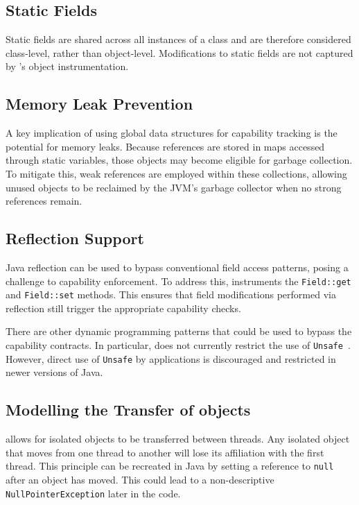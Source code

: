 \subsection{Static Fields}
Static fields are shared across all instances of a class and are therefore considered class-level, rather than object-level. Modifications to static fields are not captured by \jdala's object instrumentation. 

\subsection{Memory Leak Prevention}

A key implication of using global data structures for capability tracking is the potential for memory leaks. Because references are stored in maps accessed through static variables, those objects may become eligible for garbage collection. To mitigate this, weak references are employed within these collections, allowing unused objects to be reclaimed by the JVM's garbage collector when no strong references remain.


\subsection{Reflection Support}

Java reflection can be used to bypass conventional field access patterns, posing a challenge to capability enforcement. To address this, \jdala instruments the \texttt{Field::get} and \texttt{Field::set} methods. This ensures that field modifications performed via reflection still trigger the appropriate capability checks.

There are other dynamic programming patterns that could be used to bypass the capability contracts. In particular, \jdala does not currently restrict the use of \texttt{Unsafe}~\cite{mastrangelo2015use}. However, direct use of \texttt{Unsafe} by applications is discouraged and restricted in newer versions of Java.


\subsection{Modelling the Transfer of \Isolated objects}

\dala allows for isolated objects to be transferred between threads.
Any isolated object that moves from one thread to another will lose its affiliation with the first thread. This principle can be recreated in Java by setting a reference to \texttt{null} after an object has moved. This could lead to a non-descriptive \texttt{NullPointerException} later in the code.

